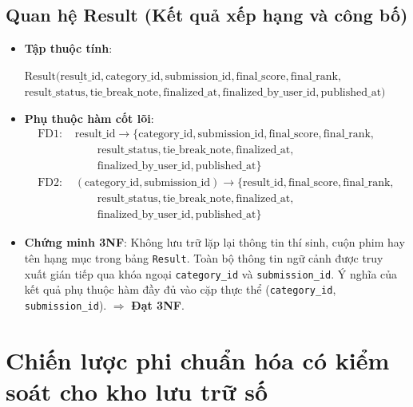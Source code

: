 \subsection{Quan hệ Result (Kết quả xếp hạng và công bố)}
\begin{itemize}
    \item \textbf{Tập thuộc tính}:
    \begin{center}
    $\text{Result}(\underline{\text{result\_id}}, \text{category\_id}, \text{submission\_id}, \text{final\_score}, \text{final\_rank},$ \\
    $\text{result\_status}, \text{tie\_break\_note}, \text{finalized\_at}, \text{finalized\_by\_user\_id}, \text{published\_at})$
    \end{center}
    \item \textbf{Phụ thuộc hàm cốt lõi}:
    \begin{align*}
        \text{FD1: } & \text{result\_id} \longrightarrow \{\text{category\_id}, \text{submission\_id}, \text{final\_score}, \text{final\_rank}, \\
        & \qquad \text{result\_status}, \text{tie\_break\_note}, \text{finalized\_at}, \\
        & \qquad \text{finalized\_by\_user\_id}, \text{published\_at}\} \\
        \text{FD2: } & (\text{category\_id}, \text{submission\_id}) \longrightarrow \{\text{result\_id}, \text{final\_score}, \text{final\_rank}, \\
        & \qquad \text{result\_status}, \text{tie\_break\_note}, \text{finalized\_at}, \\
        & \qquad \text{finalized\_by\_user\_id}, \text{published\_at}\}
    \end{align*}
    \item \textbf{Chứng minh 3NF}: Không lưu trữ lặp lại thông tin thí sinh, cuộn phim hay tên hạng mục trong bảng \texttt{Result}. Toàn bộ thông tin ngữ cảnh được truy xuất gián tiếp qua khóa ngoại \texttt{category\_id} và \texttt{submission\_id}. Ý nghĩa của kết quả phụ thuộc hàm đầy đủ vào cặp thực thể (\texttt{category\_id}, \texttt{submission\_id}). $\Rightarrow$ \textbf{Đạt 3NF}.
\end{itemize}

\section{Chiến lược phi chuẩn hóa có kiểm soát cho kho lưu trữ số}
\label{s:c4_archive_denormalization}

